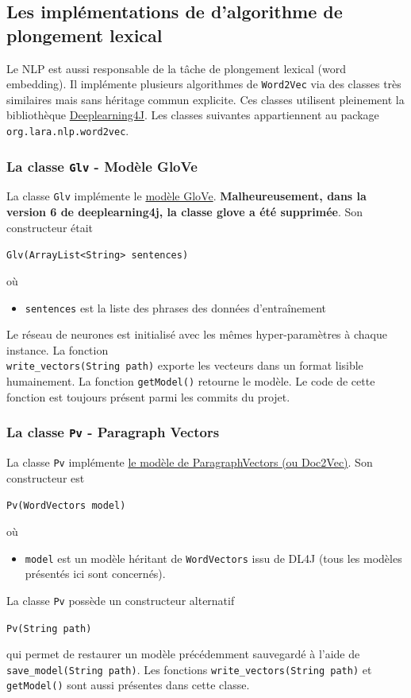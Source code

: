 \documentclass[10pt,a4paper]{article}
\newcommand\tab[1][0.5cm]{\hspace*{#1}}
\begin{document}
\subsection{Les implémentations de d'algorithme de plongement lexical}
Le NLP est aussi responsable de la tâche de plongement lexical (word embedding). Il implémente plusieurs algorithmes de \texttt{Word2Vec} via des classes très similaires mais sans héritage commun explicite. Ces classes utilisent pleinement la bibliothèque \href{https://deeplearning4j.konduit.ai/}{Deeplearning4J}. Les classes suivantes appartiennent au package \texttt{org.lara.nlp.word2vec}.
\subsubsection{La classe \texttt{Glv} - Modèle GloVe}
La classe \texttt{Glv} implémente le \href{https://en.wikipedia.org/wiki/GloVe_(machine_learning)}{modèle GloVe}. \textbf{Malheureusement, dans la version 6 de deeplearning4j, la classe glove a été supprimée}. Son constructeur était
\begin{center}
\texttt{Glv(ArrayList<String> sentences)}
\end{center}
où
\begin{itemize}
\item \texttt{sentences} est la liste des phrases des données d'entraînement
\end{itemize}
\tab Le réseau de neurones est initialisé avec les mêmes hyper-paramètres à chaque instance. La fonction \\
\noindent \texttt{write\_vectors(String path)} exporte les vecteurs dans un format lisible humainement. La fonction \texttt{getModel()} retourne le modèle. Le code de cette fonction est toujours présent parmi les commits du projet.
\subsubsection{La classe \texttt{Pv} - Paragraph Vectors}
La classe \texttt{Pv} implémente \href{https://cs.stanford.edu/~quocle/paragraph_vector.pdf}{le modèle de ParagraphVectors (ou Doc2Vec)}. Son constructeur est 
\begin{center}
\texttt{Pv(WordVectors model)}
\end{center}
où
\begin{itemize}
\item \texttt{model} est un modèle héritant de \texttt{WordVectors} issu de DL4J (tous les modèles présentés ici sont concernés).
\end{itemize}
\tab La classe \texttt{Pv} possède un constructeur alternatif
\begin{center}
\texttt{Pv(String path)}
\end{center}
qui permet de restaurer un modèle précédemment sauvegardé à l'aide de \texttt{save\_model(String path)}. Les fonctions \texttt{write\_vectors(String path)} et \texttt{getModel()} sont aussi présentes dans cette classe.
\end{document}
